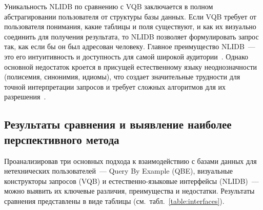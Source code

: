 Уникальность NLIDB по сравнению с VQB заключается в полном абстрагировании пользователя
от структуры базы данных. Если VQB требует от пользователя понимания, какие таблицы и поля
существуют, и как их визуально соединить для получения результата, то NLIDB позволяет
формулировать запрос так, как если бы он был адресован человеку. Главное преимущество
NLIDB~--- это его интуитивность и доступность для самой широкой
аудитории~\cite{vermaPunjabiLanguageInterface2013}. Однако основной недостаток кроется в
присущей естественному языку неоднозначности (полисемия, синонимия,
идиомы), что создает
значительные трудности для точной интерпретации запросов и требует сложных алгоритмов для
их разрешения~\cite{kimNaturalLanguageSQL2020, sidorovEstestvennyeIskusstvennyeYazyki2024}.


\subsection{Результаты сравнения и выявление наиболее перспективного метода}
Проанализировав три основных подхода к взаимодействию с базами данных для
нетехнических пользователей~--- Query By Example (QBE),
визуальные конструкторы запросов (VQB) и
естественно-языковые интерфейсы (NLIDB)~--- можно выявить их ключевые различия,
преимущества и недостатки. Результаты сравнения представлены в виде таблицы (см.~табл.~\ref{table:interfaces}).


